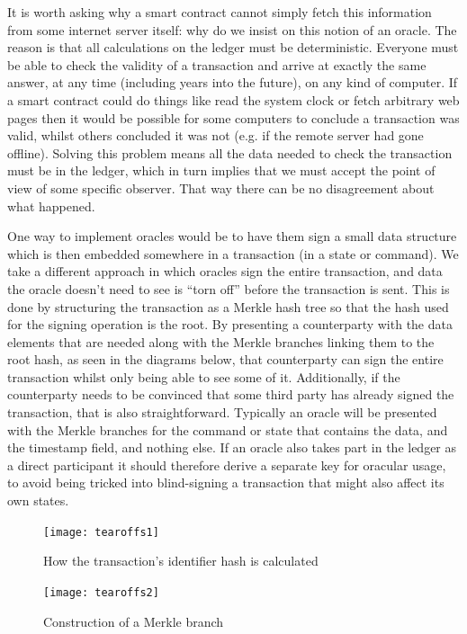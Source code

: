 \documentclass{article}
\begin{document}
It is worth asking why a smart contract cannot simply fetch this information from some internet server itself: why
do we insist on this notion of an oracle. The reason is that all calculations on the ledger must be deterministic.
Everyone must be able to check the validity of a transaction and arrive at exactly the same answer, at any time
(including years into the future), on any kind of computer. If a smart contract could do things like read the
system clock or fetch arbitrary web pages then it would be possible for some computers to conclude a transaction
was valid, whilst others concluded it was not (e.g. if the remote server had gone offline). Solving this problem
means all the data needed to check the transaction must be in the ledger, which in turn implies that we must accept
the point of view of some specific observer. That way there can be no disagreement about what happened.

One way to implement oracles would be to have them sign a small data structure which is then embedded somewhere in
a transaction (in a state or command). We take a different approach in which oracles sign the entire transaction,
and data the oracle doesn't need to see is ``torn off'' before the transaction is sent. This is done by structuring
the transaction as a Merkle hash tree so that the hash used for the signing operation is the root. By presenting a
counterparty with the data elements that are needed along with the Merkle branches linking them to the root hash,
as seen in the diagrams below, that counterparty can sign the entire transaction whilst only being able to see some
of it. Additionally, if the counterparty needs to be convinced that some third party has already signed the
transaction, that is also straightforward. Typically an oracle will be presented with the Merkle branches for the
command or state that contains the data, and the timestamp field, and nothing else. If an oracle also takes part
in the ledger as a direct participant it should therefore derive a separate key for oracular usage, to avoid
being tricked into blind-signing a transaction that might also affect its own states.

\begin{figure}[H]
\texttt{[image: tearoffs1]}
\caption{How the transaction's identifier hash is calculated}
\end{figure}

\begin{figure}[H]
\texttt{[image: tearoffs2]}
\caption{Construction of a Merkle branch}
\end{figure}
\end{document}

